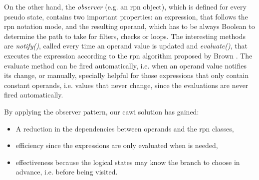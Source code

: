 	On the other hand, the \emph{observer} (e.g. an \gls{rpn} object), which is defined for every pseudo state, contains two important properties: an expression, that follows the \gls{rpn} notation mode, and the resulting operand, which has to be always Boolean to determine the path to take for filters, checks or loops. The interesting methods are \emph{notify()}, called every time an operand value is updated and \emph{evaluate()}, that executes the expression according to the \gls{rpn} algorithm proposed by Brown \cite{web:brown01}. The evaluate method can be fired automatically, i.e. when an operand value notifies its change, or manually, specially helpful for those expressions that only contain constant operands, i.e. values that never change, since the evaluations are never fired automatically.

	By applying the observer pattern, our \gls{cawi} solution has gained:

	\begin{itemize}
		\item A reduction in the dependencies between operands and the \gls{rpn} classes,
		\item efficiency since the expressions are only evaluated when is needed,
		\item effectiveness because the logical states may know the branch to choose in advance, i.e. before being visited.
	\end{itemize}

	
	